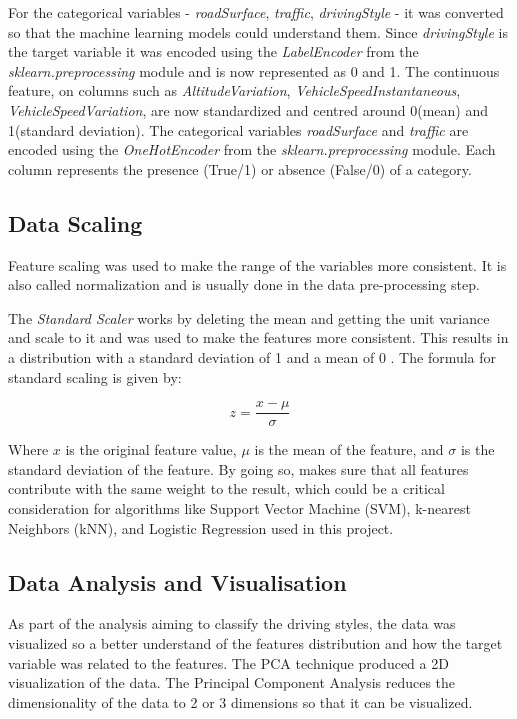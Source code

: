 \documentclass[10pt,journal,compsoc]{IEEEtran}
\begin{document}
For the categorical variables - \textit{roadSurface}, \textit{traffic}, \textit{drivingStyle} - it was converted so that the machine learning models could understand them.
Since \textit{drivingStyle} is the target variable it was encoded using the \textit{LabelEncoder} from the \textit{sklearn.preprocessing} module and is now represented as 0 and 1. The continuous feature, on columns such as \textit{AltitudeVariation}, 
\textit{VehicleSpeedInstantaneous}, \textit{VehicleSpeedVariation}, are now standardized and centred around 0(mean) and 1(standard deviation). 
The categorical variables \textit{roadSurface} and \textit{traffic} are encoded using the \textit{OneHotEncoder} from the \textit{sklearn.preprocessing} module. Each column represents
the presence (True/1) or absence (False/0) of a category.

\subsection{Data Scaling}
Feature scaling was used to make the range of the variables more consistent. It is also called normalization and is usually done in the data pre-processing step.

The \textit{Standard Scaler} works by deleting the mean and getting the unit variance and scale to it and was used to make the features more consistent.
This results in a distribution with a standard deviation of 1 and a mean of 0 \cite{app12105256}. The formula for standard scaling is given by:

\begin{equation}
    z = \frac{x - \mu}{\sigma}
\end{equation}

Where $x$ is the original feature value, $\mu$ is the mean of the feature, and $\sigma$ is the standard deviation of the feature. By going so, makes sure that all features contribute with the same weight to the result, which could be a critical consideration for algorithms like Support Vector Machine (SVM), k-nearest Neighbors (kNN), and Logistic Regression used in this project. \cite{app12105256}


\subsection{Data Analysis and Visualisation}

As part of the analysis aiming to classify the driving styles, the data was visualized so a better understand of the features distribution and how the target variable was related to the features. The PCA technique produced a 2D visualization of the data. The Principal Component Analysis reduces the dimensionality of the data to 2 or 3 dimensions 
so that it can be visualized. 
\end{document}
